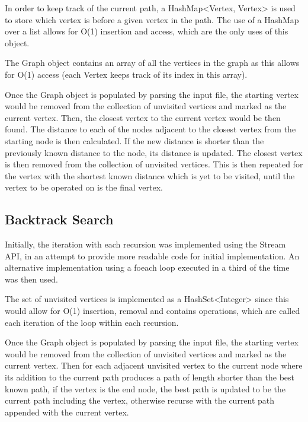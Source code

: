 \documentclass{article}
\begin{document}
    In order to keep track of the current path, a HashMap<Vertex, Vertex> is used to store which vertex is before a given
    vertex in the path.
    The use of a HashMap over a list allows for O(1) insertion and access, which are the only uses of this object.

    The Graph object contains an array of all the vertices in the graph as this allows for O(1) access (each Vertex keeps
    track of its index in this array).

    Once the Graph object is populated by parsing the input file, the starting vertex would be removed from the collection
    of unvisited vertices and marked as the current vertex.
    Then, the closest vertex to the current vertex would be then found.
    The distance to each of the nodes adjacent to the closest vertex from the starting node is then calculated.
    If the new distance is shorter than the previously known distance to the node, its distance is updated.
    The closest vertex is then removed from the collection of unvisited vertices.
    This is then repeated for the vertex with the shortest known distance which is yet to be visited, until the vertex to be
    operated on is the final vertex.


    \subsection*{Backtrack Search}

    Initially, the iteration with each recursion was implemented using the Stream API, in an attempt to provide more
    readable code for initial implementation.
    An alternative implementation using a foeach loop executed in a third of the time was then used.

    The set of unvisited vertices is implemented as a HashSet<Integer> since this would allow for O(1) insertion, removal
    and contains operations, which are called each iteration of the loop within each recursion.

    Once the Graph object is populated by parsing the input file, the starting vertex would be removed from the collection
    of unvisited vertices and marked as the current vertex.
    Then for each adjacent unvisited vertex to the current node where its addition to the current path produces a path of
    length shorter than the best known path, if the vertex is the end node, the best path is updated to be the current path
    including the vertex, otherwise recurse with the current path appended with the current vertex.
\end{document}
